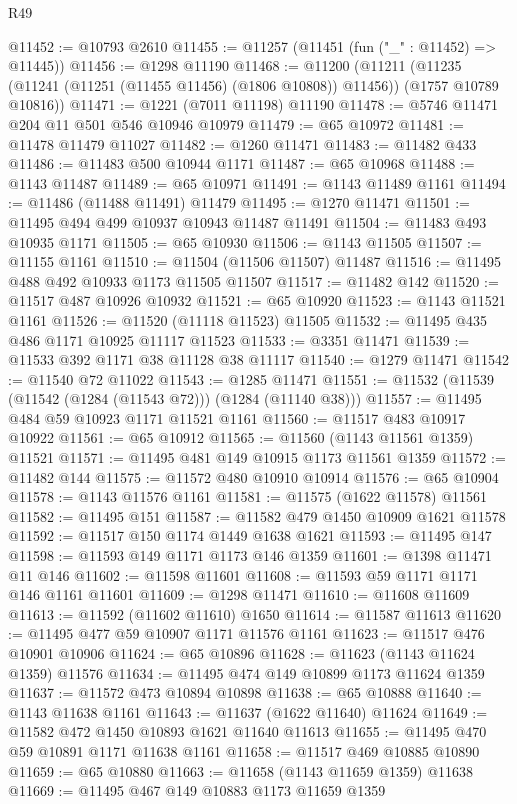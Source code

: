 \begin{lexlean}{R49}
\begin{coremodule}
@11452 := @10793 @2610
@11455 := @11257 (@11451 (fun ("_" : @11452) => @11445))
@11456 := @1298 @11190
@11468 := @11200
    (@11211 (@11235 (@11241 (@11251 (@11455 @11456) (@1806 @10808)) @11456)) (@1757 @10789 @10816))
@11471 := @1221 (@7011 @11198) @11190
@11478 := @5746 @11471 @204 @11 @501 @546 @10946 @10979
@11479 := @65 @10972
@11481 := @11478 @11479 @11027
@11482 := @1260 @11471
@11483 := @11482 @433
@11486 := @11483 @500 @10944 @1171
@11487 := @65 @10968
@11488 := @1143 @11487
@11489 := @65 @10971
@11491 := @1143 @11489 @1161
@11494 := @11486 (@11488 @11491) @11479
@11495 := @1270 @11471
@11501 := @11495 @494 @499 @10937 @10943 @11487 @11491
@11504 := @11483 @493 @10935 @1171
@11505 := @65 @10930
@11506 := @1143 @11505
@11507 := @11155 @1161
@11510 := @11504 (@11506 @11507) @11487
@11516 := @11495 @488 @492 @10933 @1173 @11505 @11507
@11517 := @11482 @142
@11520 := @11517 @487 @10926 @10932
@11521 := @65 @10920
@11523 := @1143 @11521 @1161
@11526 := @11520 (@11118 @11523) @11505
@11532 := @11495 @435 @486 @1171 @10925 @11117 @11523
@11533 := @3351 @11471
@11539 := @11533 @392 @1171 @38 @11128 @38 @11117
@11540 := @1279 @11471
@11542 := @11540 @72 @11022
@11543 := @1285 @11471
@11551 := @11532 (@11539 (@11542 (@1284 (@11543 @72))) (@1284 (@11140 @38)))
@11557 := @11495 @484 @59 @10923 @1171 @11521 @1161
@11560 := @11517 @483 @10917 @10922
@11561 := @65 @10912
@11565 := @11560 (@1143 @11561 @1359) @11521
@11571 := @11495 @481 @149 @10915 @1173 @11561 @1359
@11572 := @11482 @144
@11575 := @11572 @480 @10910 @10914
@11576 := @65 @10904
@11578 := @1143 @11576 @1161
@11581 := @11575 (@1622 @11578) @11561
@11582 := @11495 @151
@11587 := @11582 @479 @1450 @10909 @1621 @11578
@11592 := @11517 @150 @1174 @1449 @1638 @1621
@11593 := @11495 @147
@11598 := @11593 @149 @1171 @1173 @146 @1359
@11601 := @1398 @11471 @11 @146
@11602 := @11598 @11601
@11608 := @11593 @59 @1171 @1171 @146 @1161 @11601
@11609 := @1298 @11471
@11610 := @11608 @11609
@11613 := @11592 (@11602 @11610) @1650
@11614 := @11587 @11613
@11620 := @11495 @477 @59 @10907 @1171 @11576 @1161
@11623 := @11517 @476 @10901 @10906
@11624 := @65 @10896
@11628 := @11623 (@1143 @11624 @1359) @11576
@11634 := @11495 @474 @149 @10899 @1173 @11624 @1359
@11637 := @11572 @473 @10894 @10898
@11638 := @65 @10888
@11640 := @1143 @11638 @1161
@11643 := @11637 (@1622 @11640) @11624
@11649 := @11582 @472 @1450 @10893 @1621 @11640 @11613
@11655 := @11495 @470 @59 @10891 @1171 @11638 @1161
@11658 := @11517 @469 @10885 @10890
@11659 := @65 @10880
@11663 := @11658 (@1143 @11659 @1359) @11638
@11669 := @11495 @467 @149 @10883 @1173 @11659 @1359

\end{coremodule}
\end{lexlean}
